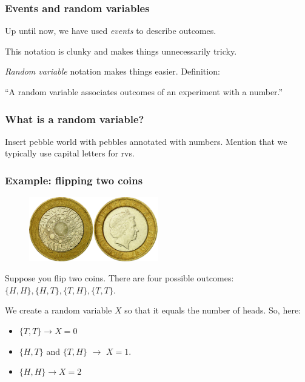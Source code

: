 \documentclass{beamer}
\begin{document}
	\begin{frame}
		\frametitle{Events and random variables}
		Up until now, we have used \textit{events} to describe outcomes.
		
		\vspace{0.5cm}
		
		This notation is clunky and makes things unnecessarily tricky.
		
		\vspace{0.5cm}
		
		\textit{Random variable} notation makes things easier. Definition:
		
		``A random variable associates outcomes of an experiment with a number.''
		
	\end{frame}
	
	\begin{frame}
		\frametitle{What is a random variable?}
		
		Insert pebble world with pebbles annotated with numbers. Mention that we typically use capital letters for rvs.
		
	\end{frame}
	
	\begin{frame}
		\frametitle{Example: flipping two coins}
		
		\begin{figure}[ht]
			\includegraphics[width=0.5\textwidth]{./figures/coins.jpeg}
		\end{figure}
		
		Suppose you flip two coins. There are four possible outcomes: $\{H,H\}, \{H,T\}, \{T,H\}, \{T,T\}$.
		
		\vspace{0.5cm}
		
		We create a random variable $X$ so that it equals the number of heads. So, here:
		
		\begin{itemize}
			\item $\{T,T\}\rightarrow X=0$
			\item $\{H,T\}$ and $\{T,H\}$ $\rightarrow$ $X=1$.
			\item $\{H,H\} \rightarrow X=2$
		\end{itemize}
		
	\end{frame}
	
\end{document}
